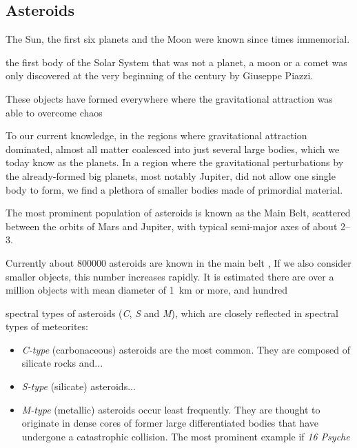     \subsection{Asteroids} \label{iaa}
        The Sun, the first six planets and the Moon were known since times immemorial.

        the first body of the Solar System that was not a planet, a moon or a comet was only discovered at
        the very beginning of the  century by Giuseppe Piazzi.

        These objects have formed everywhere where the gravitational attraction was able to overcome chaos \citep{???}

        To our current knowledge, in the regions where gravitational attraction dominated, almost all matter
        coalesced into just several large bodies, which we today know as the planets.
        In a region where the gravitational perturbations by the already-formed big planets, most notably Jupiter,
        did not allow one single body to form, we find a plethora of smaller bodies made of primordial material.

        The most prominent population of asteroids is known as the Main Belt, scattered between the orbits
        of Mars and Jupiter, with typical semi-major axes of about \SIrange{2}{3}{\au}.

        Currently about \num{800000} asteroids are known in the main belt ,
        If we also consider smaller objects, this number increases rapidly.
        It is estimated \citep{???} there are over a million objects with mean diameter of \SI{1}{\kilo\metre} or more,
        and hundred

        spectral types of asteroids (\emph{C}, \emph{S} and \emph{M}), which are closely reflected in
        spectral types of meteorites:

        \begin{itemize}
            \item \emph{C-type} (carbonaceous) asteroids are the most common. They are composed of silicate rocks and... 
            \item \emph{S-type} (silicate) asteroids... 
            \item \emph{M-type} (metallic) asteroids occur least frequently.
                They are thought to originate in dense cores of former large differentiated bodies that have
                undergone a catastrophic collision.
                The most prominent example if \emph{16 Psyche}
        \end{itemize}


